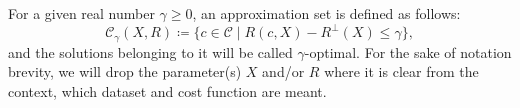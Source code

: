 \begin{definition}
\label{def:approximation_set}
For a given real number $\gamma \ge 0$, an approximation set is defined as follows:
\begin{equation}
  \mathcal{C}_\gamma (X, R) \coloneqq 
  \{c \in \mathcal{C} \mid R(c, X) - R^\bot(X) \le \gamma\},
\end{equation}
%
and the solutions belonging to it will be called $\gamma$-optimal. 
For the sake
of notation brevity, we will drop the parameter(s) $X$ and/or $R$ where it is
clear from the context, which dataset and cost function are meant. 
\end{definition}


